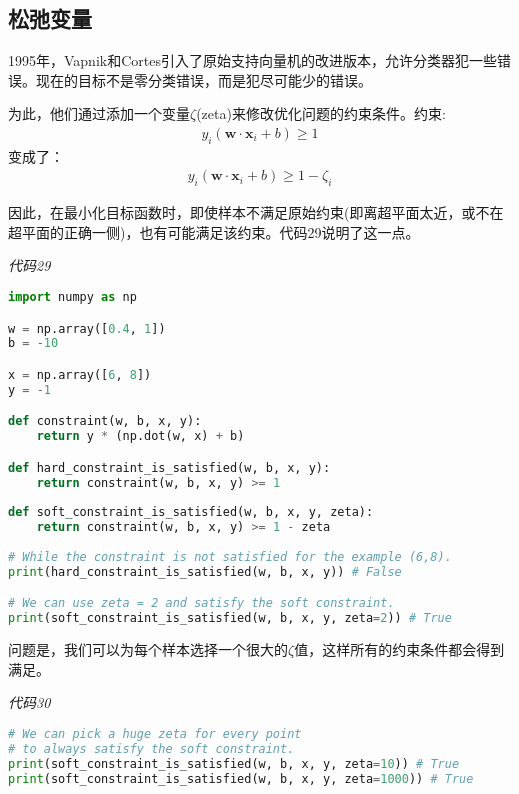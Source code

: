 \subsection{松弛变量}

1995年，Vapnik和Cortes引入了原始支持向量机的改进版本，允许分类器犯一些错误。现在的目标不是零分类错误，而是犯尽可能少的错误。

为此，他们通过添加一个变量$\zeta$(zeta)来修改优化问题的约束条件。约束:
\begin{gather*}
y_i (\mathbf{w}\cdot \mathbf{x}_i + b) \geq 1
\end{gather*}
变成了：
\begin{gather*}
y_i (\mathbf{w}\cdot \mathbf{x}_i + b) \geq 1-\zeta_i
\end{gather*}

因此，在最小化目标函数时，即使样本不满足原始约束(即离超平面太近，或不在超平面的正确一侧)，也有可能满足该约束。代码29说明了这一点。

\emph{代码29}

\begin{lstlisting}[language=python]
import numpy as np 

w = np.array([0.4, 1]) 
b = -10 

x = np.array([6, 8]) 
y = -1 

def constraint(w, b, x, y): 
    return y * (np.dot(w, x) + b)

def hard_constraint_is_satisfied(w, b, x, y): 
    return constraint(w, b, x, y) >= 1 
    
def soft_constraint_is_satisfied(w, b, x, y, zeta): 
    return constraint(w, b, x, y) >= 1 - zeta 
    
# While the constraint is not satisfied for the example (6,8). 
print(hard_constraint_is_satisfied(w, b, x, y)) # False 

# We can use zeta = 2 and satisfy the soft constraint. 
print(soft_constraint_is_satisfied(w, b, x, y, zeta=2)) # True
\end{lstlisting}

问题是，我们可以为每个样本选择一个很大的$\zeta$值，这样所有的约束条件都会得到满足。

\emph{代码30}

\begin{lstlisting}[language=python]
# We can pick a huge zeta for every point 
# to always satisfy the soft constraint. 
print(soft_constraint_is_satisfied(w, b, x, y, zeta=10)) # True 
print(soft_constraint_is_satisfied(w, b, x, y, zeta=1000)) # True
\end{lstlisting}

